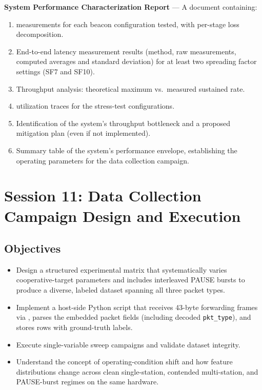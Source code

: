 \documentclass[11pt,letterpaper]{article}
\begin{document}
	\begin{tcolorbox}[deliverable={Session 10 Deliverable}]
		\textbf{System Performance Characterization Report} --- A document containing:
		\begin{enumerate}
			\item \PER{} measurements for each beacon configuration tested, with per-stage loss decomposition.
			\item End-to-end latency measurement results (method, raw measurements, computed averages and standard deviation) for at least two spreading factor settings (SF7 and SF10).
			\item Throughput analysis: theoretical maximum vs.\ measured sustained rate.
			\item \FIFO{} utilization traces for the stress-test configurations.
			\item Identification of the system's throughput bottleneck and a proposed mitigation plan (even if not implemented).
			\item Summary table of the system's performance envelope, establishing the operating parameters for the data collection campaign.
		\end{enumerate}
	\end{tcolorbox}

	\newpage
	\section{Session 11: Data Collection Campaign Design and Execution}
	\label{sec:collection}

	\subsection{Objectives}

	\begin{itemize}[leftmargin=2em]
		\item Design a structured experimental matrix that systematically varies cooperative-target parameters and includes interleaved PAUSE bursts to produce a diverse, labeled dataset spanning all three packet types.
		\item Implement a host-side Python script that receives 43-byte forwarding frames via \UART{}, parses the embedded packet fields (including decoded \texttt{pkt\_type}), and stores rows with ground-truth labels.
		\item Execute single-variable sweep campaigns and validate dataset integrity.
		\item Understand the concept of operating-condition shift and how feature distributions change across clean single-station, contended multi-station, and PAUSE-burst regimes on the same hardware.
	\end{itemize}
\end{document}
